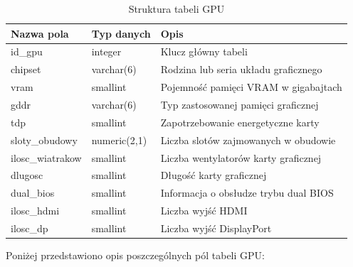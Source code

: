 \documentclass[a4paper,twoside,12pt]{book}
\begin{document}
\begin{table}[H]
\centering
\caption{Struktura tabeli GPU}
\label{tab:gpu}
\begin{tabular}{lll}
\hline
Nazwa pola & Typ danych & Opis \\ \hline
id\_gpu & integer & Klucz główny tabeli \\
chipset & varchar(6) & Rodzina lub seria układu graficznego \\
vram & smallint & Pojemność pamięci VRAM w gigabajtach \\
gddr & varchar(6) & Typ zastosowanej pamięci graficznej \\
tdp & smallint & Zapotrzebowanie energetyczne karty \\
sloty\_obudowy & numeric(2,1) & Liczba slotów zajmowanych w obudowie \\
ilosc\_wiatrakow & smallint & Liczba wentylatorów karty graficznej \\
dlugosc & smallint & Długość karty graficznej \\
dual\_bios & smallint & Informacja o obsłudze trybu dual BIOS \\
ilosc\_hdmi & smallint & Liczba wyjść HDMI \\
ilosc\_dp & smallint & Liczba wyjść DisplayPort \\ \hline
\end{tabular}
\end{table}

Poniżej przedstawiono opis poszczególnych pól tabeli GPU:
\end{document}
